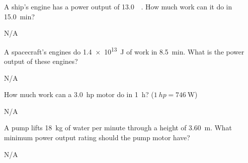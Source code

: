 \begin{question}[ID=power-C-Q02,topic=power,difficulty=C]
    A ship's engine has a power output of \SI{13.0}{\mega\watts}.
    How much work can it do in \SI{15.0}{\minute}?
\end{question}
\begin{solution}
    N/A
\end{solution}


\begin{question}[ID=power-C-Q03,topic=power,difficulty=C]
    A spacecraft's engines do \SI{1.4e13}{\joule} of work in
        \SI{8.5}{\minute}.
    What is the power output of these engines?
\end{question}
\begin{solution}
    N/A
\end{solution}


\begin{question}[ID=power-C-Q04,topic=power,difficulty=C]
    How much work can a \SI{3.0}{hp} motor do in \SI{1}{\hour}?
    ($\SI{1}{hp} = \SI{746}{\watt}$)
\end{question}
\begin{solution}
    N/A
\end{solution}


\begin{question}[ID=power-C-Q05,topic=power,difficulty=C]
    A pump lifts \SI{18}{\kilo\gram} of water per minute through
        a height of \SI{3.60}{\meter}.
    What minimum power output rating should the pump motor have?
\end{question}
\begin{solution}
    N/A
\end{solution}


\endinput

